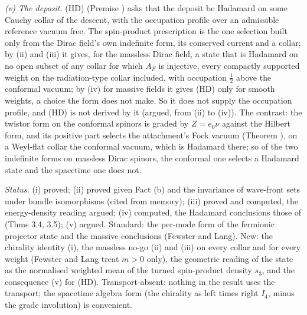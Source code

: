 \emph{(v) The deposit.} (HD) (Premise ) asks that the deposit be Hadamard on some Cauchy collar of the descent, with the occupation profile over an admissible reference vacuum free. The spin-product prescription is the one selection built only from the Dirac field's own indefinite form, its conserved current and a collar; by (ii) and (iii) it gives, for the massless Dirac field, a state that is Hadamard on no open subset of any collar for which $A_{F}$ is injective, every compactly supported weight on the radiation-type collar included, with occupation $\tfrac12$ above the conformal vacuum; by (iv) for massive fields it gives (HD) only for smooth weights, a choice the form does not make. So it does not supply the occupation profile, and (HD) is not derived by it (argued, from (ii) to (iv)). The contrast: the twistor form on the conformal spinors is graded by $Z = e_{0}\nu$ against the Hilbert form, and its positive part selects the attachment's Fock vacuum (Theorem ), on a Weyl-flat collar the conformal vacuum, which is Hadamard there; so of the two indefinite forms on massless Dirac spinors, the conformal one selects a Hadamard state and the spacetime one does not.

\emph{Status.} (i) proved; (ii) proved given Fact (b) and the invariance of wave-front sets under bundle isomorphisms (cited from memory); (iii) proved and computed, the energy-density reading argued; (iv) computed, the Hadamard conclusions those of \cite{FewsterLang2015} (Thms 3.4, 3.5); (v) argued. Standard: the per-mode form of the fermionic projector state and the massive conclusions (Fewster and Lang). New: the chirality identity (i), the massless no-go (ii) and (iii) on every collar and for every weight (Fewster and Lang treat $m > 0$ only), the geometric reading of the state as the normalised weighted mean of the turned spin-product density $s_{3}$, and the consequence (v) for (HD). Transport-absent: nothing in the result uses the transport; the spacetime algebra form (the chirality as left times right $I_{4}$, minus the grade involution) is convenient.
